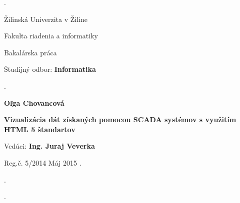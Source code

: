 \begin{titlepage}
\phantom.

\bigskip

\begin{center}
{\sc\LARGE Žilinská Univerzita v Žiline}
\medskip

{\sc\Large Fakulta riadenia a informatiky}

\vfill\vfill\vfill\vfill

{\sc\LARGE Bakalárska práca}

\medskip

{\large Študijný odbor: {\bf Informatika}}
\end{center}


\vfill\vfill\vfill\vfill


\phantom.\hfill
\begin{minipage}{10cm}
\begin{center}
{\large\bf Oľga Chovancová}

\medskip

{\large\bf Vizualizácia dát získaných pomocou SCADA systémov s využitím HTML 5 štandartov}

\medskip

Vedúci: {\bf Ing. Juraj Veverka}

\medskip
 
\hfill
Reg.č. 5/2014
\hfill
Máj 2015
\hfill\phantom.
\end{center}
\end{minipage}
\hspace{1.7cm}\phantom.

\vspace{2.9cm}

\phantom.
\end{titlepage}



\begin{abstract}

\noindent
{\sc Chovancová Oľga:} {\em Vizualizácia dát získaných pomocou SCADA systémov s využitím HTML 5 štandartov}
[Bakalárska práca] 

\noindent
Žilinská Univerzita v~Žiline,  
Fakulta riadenia a informatiky,  
Katedra TODO.

\noindent  
Vedúci: Ing. Juraj Veverka 
 
\noindent  
Stupeň odbornej kvalifikácie:
....

\noindent
FRI ŽU v~Žiline, 2015 --- ?? s.

\bigskip

Obsahom práce je vzorová sada grafických komponentov na vizualizáciu technologických procesov s využitím HTML 5 štandardov. Jedná sa o grafické komponenty, ktoré nie sú bežne dostupné na tvorbu interaktívnych webových aplikácii ako napríklad vizualizácie mechanických súčasti hydraulických systémov, technologických liniek, silových a výkonových častí automatizačných sústav. Návrh interface, pomocou, ktorého budú tieto komponenty komunikovať so serverovou časťou SCADA systému. Cieľová platforma pre výslednú webovú aplikáciu bude kompatibilná s rodinou štandardov HTML 5 pre každý webový prehľadávač. 
\end{abstract}


